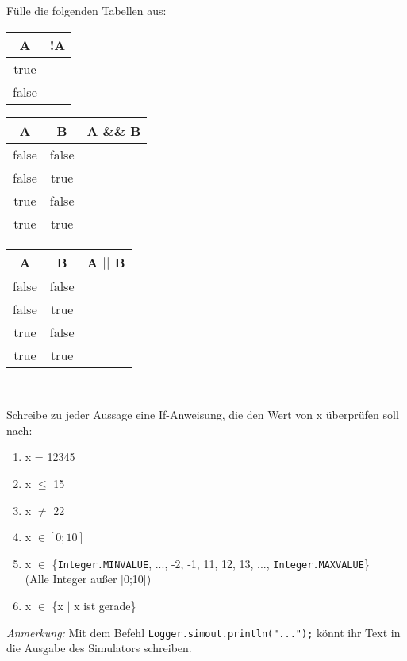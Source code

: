             \subexcercise Fülle die folgenden Tabellen aus:\\
            \begin{center}
            \begin{tabular}{ c | c }
            A & !A \\
            \hline
            true & \\
            false & \\
            \end{tabular}
            \quad
            \begin{tabular}{ c | c | c }
            A & B & A \&\& B \\
            \hline
            false & false & \\
            false & true & \\
            true & false & \\
            true & true & \\
            \end{tabular}
            \quad
            \begin{tabular}{ c | c | c }
            A & B & A $||$ B \\
            \hline
            false & false & \\
            false & true & \\
            true & false & \\
            true & true & \\
            \end{tabular}\\
            \end{center}

            \subexcercise Schreibe zu jeder Aussage eine If-Anweisung, die den Wert von x überprüfen soll nach:
            \begin{enumerate}[label=(\roman*)]
                \item x = 12345
                \item x $\leq$ 15
                \item x $\neq$ 22
                \item x $\in [0; 10]$
                \item x $\in$ \{\texttt{Integer.MINVALUE}, ..., -2, -1, 11, 12, 13, ..., \texttt{Integer.MAXVALUE}\}\\(Alle Integer außer [0;10])
                \item x $\in$ \{x $|$ x ist gerade\}
            \end{enumerate}
            \emph{Anmerkung:} Mit dem Befehl \lstinline{Logger.simout.println("...");} könnt ihr Text in die Ausgabe des Simulators schreiben.

